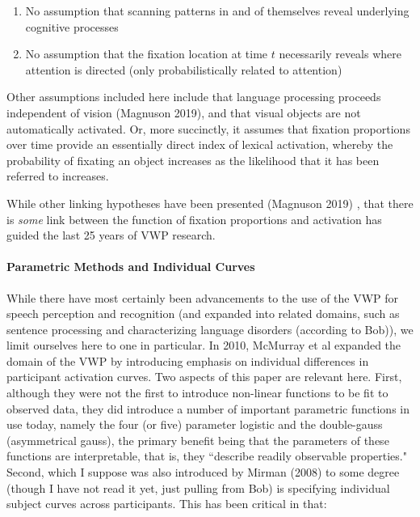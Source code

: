 \begin{singlespace}
\begin{enumerate}
\vspace{-3mm}
\item No assumption that scanning patterns in and of themselves reveal underlying cognitive processes
\item No assumption that the fixation location at time $t$ necessarily reveals where attention is directed (only probabilistically related to attention)
\end{enumerate}
\end{singlespace}

Other assumptions included here include that language processing proceeds independent of vision (Magnuson 2019), and that visual objects are not automatically activated. Or, more succinctly, it assumes that fixation proportions over time provide an essentially direct index of lexical activation, whereby the probability of fixating an object increases as the likelihood that it has been referred to increases.


While other linking hypotheses have been presented (Magnuson 2019) \cite{Magnuson2019}, that there is \textit{some} link between the function of fixation proportions and activation has guided the last 25 years of VWP research.



\paragraph{Parametric Methods and Individual Curves} While there have most certainly been advancements to the use of the VWP for speech perception and recognition (and expanded into related domains, such as sentence processing and characterizing language disorders (according to Bob)), we  limit ourselves here to one in particular. In 2010, McMurray et al expanded the domain of the VWP by introducing emphasis on individual differences in participant activation curves. Two aspects of this paper are relevant here. First, although they were not the first to introduce non-linear functions to be fit to observed data, they did introduce a number of important parametric functions in use today, namely the four (or five) parameter logistic and the double-gauss (asymmetrical gauss), the primary benefit being that the parameters of these functions are interpretable, that is, they ``describe readily observable properties." Second, which I suppose was also introduced by Mirman (2008) \cite{Mirman2008} to some degree (though I have not read it yet, just pulling from Bob) is specifying individual subject curves across participants. This has been critical in that:

